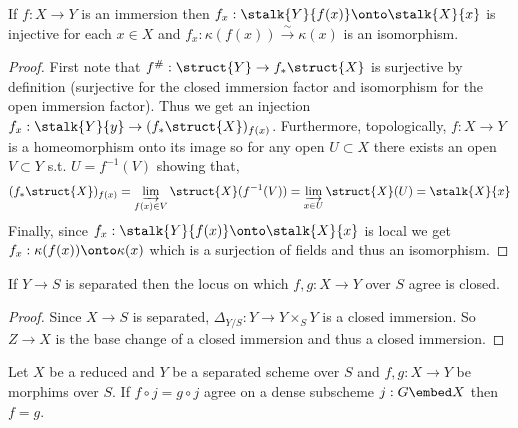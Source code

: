 \documentclass[12pt]{article}
\begin{document}
\begin{lemma}
If $f : X \to Y$ is an immersion then $f_x : \stalk{Y}{f(x)} \onto \stalk{X}{x}$ is injective for each $x \in X$ and $f_x : \kappa(f(x)) \xrightarrow{\sim} \kappa(x)$ is an isomorphism.
\end{lemma}

\begin{proof}
First note that $f^{\#} : \struct{Y} \to f_* \struct{X}$ is surjective by definition (surjective for the closed immersion factor and isomorphism for the open immersion factor). Thus we get an injection $f_x : \stalk{Y}{y} \to (f_* \struct{X})_{f(x)}$. Furthermore, topologically, $f : X \to Y$ is a homeomorphism onto its image so for any open $U \subset X$ there exists an open $V \subset Y$ s.t. $U = f^{-1}(V)$ showing that,
\[ (f_* \struct{X})_{f(x)} = \varinjlim_{f(x) \in V} \struct{X}(f^{-1}(V)) = \varinjlim_{x \in U} \struct{X}(U) = \stalk{X}{x} \]
Finally, since $f_x : \stalk{Y}{f(x)} \onto \stalk{X}{x}$ is local we get $f_x : \kappa(f(x)) \onto \kappa(x)$ which is a surjection of fields and thus an isomorphism. 
\end{proof}

\begin{lemma}
If $Y \to S$ is separated then the locus on which $f,g : X \to Y$ over $S$ agree is closed.
\end{lemma}

\begin{proof}
Since $X \to S$ is separated, $\Delta_{Y/S} : Y \to Y \times_S Y$ is a closed immersion. So $Z \to X$ is the base change of a closed immersion and thus a closed immersion. 
\end{proof}

\begin{lemma}
Let $X$ be a reduced and $Y$ be a separated scheme over $S$ and $f ,g : X \to Y$ be morphims over $S$. If $f \circ j = g \circ j$ agree on a dense subscheme $j : G \embed X$ then $f = g$.
\end{lemma}
\end{document}
